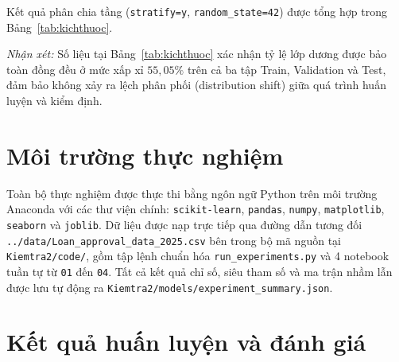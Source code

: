 \documentclass[12pt,a4paper,oneside]{report}
\begin{document}
Kết quả phân chia tầng (\texttt{stratify=y}, \texttt{random\_state=42}) được tổng hợp trong Bảng~\ref{tab:kichthuoc}.

\begin{table}[H]
  \caption{Kích thước và phân bố nhãn mục tiêu qua các tập dữ liệu.}
  \label{tab:kichthuoc}
\end{table}

\textit{Nhận xét:} Số liệu tại Bảng~\ref{tab:kichthuoc} xác nhận tỷ lệ lớp dương được bảo toàn đồng đều ở mức xấp xỉ $55{,}05\%$ trên cả ba tập Train, Validation và Test, đảm bảo không xảy ra lệch phân phối (distribution shift) giữa quá trình huấn luyện và kiểm định.

\section{Môi trường thực nghiệm}

Toàn bộ thực nghiệm được thực thi bằng ngôn ngữ Python trên môi trường Anaconda với các thư viện chính: \texttt{scikit-learn}, \texttt{pandas}, \texttt{numpy}, \texttt{matplotlib}, \texttt{seaborn} và \texttt{joblib}. Dữ liệu được nạp trực tiếp qua đường dẫn tương đối \texttt{../data/}\allowbreak\texttt{Loan\_approval\_data\_2025.csv} bên trong bộ mã nguồn tại \texttt{Kiemtra2/code/}, gồm tập lệnh chuẩn hóa \texttt{run\_experiments.py} và 4 notebook tuần tự từ \texttt{01} đến \texttt{04}. Tất cả kết quả chỉ số, siêu tham số và ma trận nhầm lẫn được lưu tự động ra \texttt{Kiemtra2/models/}\allowbreak\texttt{experiment\_summary.json}.

\section{Kết quả huấn luyện và đánh giá}
\end{document}
